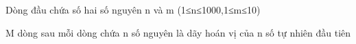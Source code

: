 Dòng đầu chứa số hai số nguyên n và m (1≤n≤1000,1≤m≤10)  

   M dòng sau mỗi dòng chứa n số nguyên là dãy hoán vị của n số tự nhiên đầu tiên